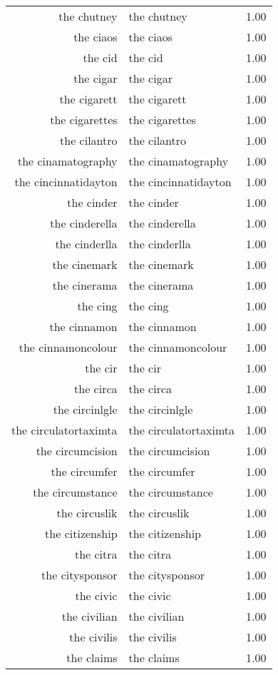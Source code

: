 \begin{table}[ht]
\begin{tabular}{rlr}
  the chutney & the chutney & 1.00 \\ 
  the ciaos & the ciaos & 1.00 \\ 
  the cid & the cid & 1.00 \\ 
  the cigar & the cigar & 1.00 \\ 
  the cigarett & the cigarett & 1.00 \\ 
  the cigarettes & the cigarettes & 1.00 \\ 
  the cilantro & the cilantro & 1.00 \\ 
  the cinamatography & the cinamatography & 1.00 \\ 
  the cincinnatidayton & the cincinnatidayton & 1.00 \\ 
  the cinder & the cinder & 1.00 \\ 
  the cinderella & the cinderella & 1.00 \\ 
  the cinderlla & the cinderlla & 1.00 \\ 
  the cinemark & the cinemark & 1.00 \\ 
  the cinerama & the cinerama & 1.00 \\ 
  the cing & the cing & 1.00 \\ 
  the cinnamon & the cinnamon & 1.00 \\ 
  the cinnamoncolour & the cinnamoncolour & 1.00 \\ 
  the cir & the cir & 1.00 \\ 
  the circa & the circa & 1.00 \\ 
  the circinlgle & the circinlgle & 1.00 \\ 
  the circulatortaximta & the circulatortaximta & 1.00 \\ 
  the circumcision & the circumcision & 1.00 \\ 
  the circumfer & the circumfer & 1.00 \\ 
  the circumstance & the circumstance & 1.00 \\ 
  the circuslik & the circuslik & 1.00 \\ 
  the citizenship & the citizenship & 1.00 \\ 
  the citra & the citra & 1.00 \\ 
  the citysponsor & the citysponsor & 1.00 \\ 
  the civic & the civic & 1.00 \\ 
  the civilian & the civilian & 1.00 \\ 
  the civilis & the civilis & 1.00 \\ 
  the claims & the claims & 1.00 \\ 

\end{tabular}
\end{table}
